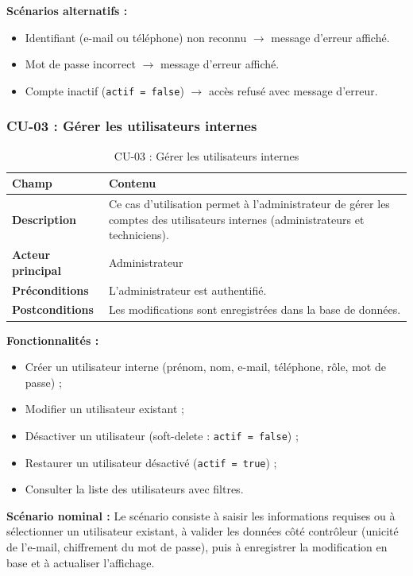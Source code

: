 \textbf{Scénarios alternatifs :}
\begin{itemize}
    \item Identifiant (e-mail ou téléphone) non reconnu $\rightarrow$ message d'erreur affiché.
    \item Mot de passe incorrect $\rightarrow$ message d'erreur affiché.
    \item Compte inactif (\texttt{actif = false}) $\rightarrow$ accès refusé avec message d'erreur.
\end{itemize}

\subsubsection{CU-03 : Gérer les utilisateurs internes}

\begin{table}[H]
\centering
\caption{CU-03 : Gérer les utilisateurs internes}
\label{tab:ch3:cu03}
\begin{tabular}{|p{3.5cm}|p{11cm}|}
\hline
\textbf{Champ} & \textbf{Contenu} \\
\hline
\textbf{Description}
  & Ce cas d'utilisation permet à l'administrateur de gérer les comptes des utilisateurs
    internes (administrateurs et techniciens). \\
\hline
\textbf{Acteur principal}
  & Administrateur \\
\hline
\textbf{Préconditions}
  & L'administrateur est authentifié. \\
\hline
\textbf{Postconditions}
  & Les modifications sont enregistrées dans la base de données. \\
\hline
\end{tabular}
\end{table}

\textbf{Fonctionnalités :}
\begin{itemize}
    \item Créer un utilisateur interne (prénom, nom, e-mail, téléphone, rôle, mot de passe) ;
    \item Modifier un utilisateur existant ;
    \item Désactiver un utilisateur (soft-delete : \texttt{actif = false}) ;
    \item Restaurer un utilisateur désactivé (\texttt{actif = true}) ;
    \item Consulter la liste des utilisateurs avec filtres.
\end{itemize}

\textbf{Scénario nominal :} Le scénario consiste à saisir les informations requises ou à sélectionner un utilisateur existant, à valider les données côté contrôleur (unicité de l'e-mail, chiffrement du mot de passe), puis à enregistrer la modification en base et à actualiser l'affichage.

